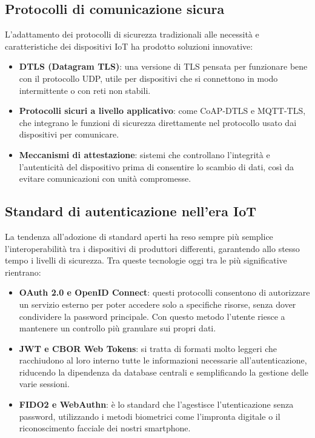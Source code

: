 \subsection{Protocolli di comunicazione sicura}

L'adattamento dei protocolli di sicurezza tradizionali alle necessità e caratteristiche dei dispositivi IoT ha prodotto soluzioni innovative:

\begin{itemize}
    \item \textbf{DTLS (Datagram TLS)}: una versione di TLS pensata per funzionare bene con il protocollo UDP, utile per dispositivi che si connettono in modo intermittente o con reti non stabili.
    \item \textbf{Protocolli sicuri a livello applicativo}: come CoAP-DTLS e MQTT-TLS, che integrano le funzioni di sicurezza direttamente nel protocollo usato dai dispositivi per comunicare.
    \item \textbf{Meccanismi di attestazione}: sistemi che controllano l’integrità e l’autenticità del dispositivo prima di consentire lo scambio di dati, così da evitare comunicazioni con unità compromesse.
\end{itemize}

\subsection{Standard di autenticazione nell'era IoT}

La tendenza all’adozione di standard aperti ha reso sempre più semplice l’interoperabilità tra i dispositivi di produttori differenti, garantendo allo stesso tempo i livelli di sicurezza. Tra queste tecnologie oggi tra le più significative rientrano:

\begin{itemize}
\item \textbf{OAuth 2.0 e OpenID Connect}: questi protocolli consentono di autorizzare un servizio esterno per poter  accedere solo a specifiche risorse, senza dover condividere la password principale. Con questo metodo l’utente riesce a mantenere un controllo più granulare sui propri dati.
\item \textbf{JWT e CBOR Web Tokens}: si tratta di formati molto leggeri che racchiudono al loro interno tutte le informazioni necessarie all’autenticazione, riducendo la dipendenza da database centrali e semplificando la gestione delle varie sessioni.
\item \textbf{FIDO2 e WebAuthn}: è lo standard che  l’agestisce l'utenticazione senza password, utilizzando i metodi biometrici come l’impronta digitale o il riconoscimento facciale dei nostri smartphone.
\end{itemize}

